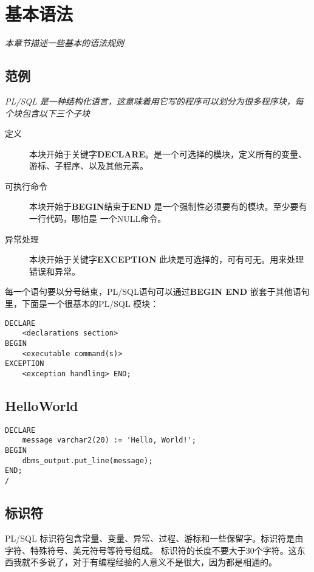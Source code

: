 \documentclass{article}
\begin{document}
\section{基本语法}
\textit{本章节描述一些基本的语法规则}
\subsection{范例}
\textit{PL/SQL 是一种结构化语言，这意味着用它写的程序可以划分为很多程序块，每个块包含以下三个子块}

\begin{description}
\item[定义] 本块开始于关键字\textbf{DECLARE}。是一个可选择的模块，定义所有的变量、游标、子程序、以及其他元素。
\item[可执行命令] 本块开始于\textbf{BEGIN}结束于\textbf{END} 是一个强制性必须要有的模块。至少要有一行代码，哪怕是
	一个NULL命令。
\item[异常处理] 本块开始于关键字\textbf{EXCEPTION} 此块是可选择的，可有可无。用来处理错误和异常。
\end{description}


每一个语句要以分号结束，PL/SQL语句可以通过\textbf{BEGIN END} 嵌套于其他语句里，下面是一个很基本的PL/SQL 模块：

\begin{verbatim}
DECLARE 
	<declarations section> 
BEGIN 
	<executable command(s)> 
EXCEPTION 
	<exception handling> END;
\end{verbatim}

\subsection{HelloWorld}
\begin{verbatim}
DECLARE
	message varchar2(20) := 'Hello, World!';
BEGIN
	dbms_output.put_line(message);
END;
/
\end{verbatim}

\subsection{标识符}
PL/SQL 标识符包含常量、变量、异常、过程、游标和一些保留字。标识符是由字符、特殊符号、美元符号等符号组成。
标识符的长度不要大于30个字符。这东西我就不多说了，对于有编程经验的人意义不是很大，因为都是相通的。
\end{document}
